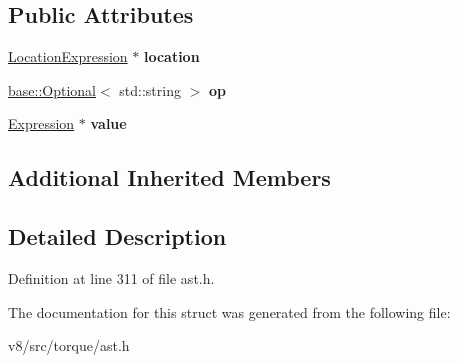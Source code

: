 \subsection*{Public Attributes}
\begin{DoxyCompactItemize}
\item 
\mbox{\label{structv8_1_1internal_1_1torque_1_1AssignmentExpression_af93c41e18fd7829d63695b62e7dfe447}} 
\mbox{\hyperlink{structv8_1_1internal_1_1torque_1_1LocationExpression}{Location\+Expression}} $\ast$ {\bfseries location}
\item 
\mbox{\label{structv8_1_1internal_1_1torque_1_1AssignmentExpression_a302126201f6ce6fd049f1ca1d494632d}} 
\mbox{\hyperlink{classv8_1_1base_1_1Optional}{base\+::\+Optional}}$<$ std\+::string $>$ {\bfseries op}
\item 
\mbox{\label{structv8_1_1internal_1_1torque_1_1AssignmentExpression_a07cbf4b38affcb0e36f037f43ee422ab}} 
\mbox{\hyperlink{structv8_1_1internal_1_1torque_1_1Expression}{Expression}} $\ast$ {\bfseries value}
\end{DoxyCompactItemize}
\subsection*{Additional Inherited Members}


\subsection{Detailed Description}


Definition at line 311 of file ast.\+h.



The documentation for this struct was generated from the following file\+:\begin{DoxyCompactItemize}
\item 
v8/src/torque/ast.\+h\end{DoxyCompactItemize}
